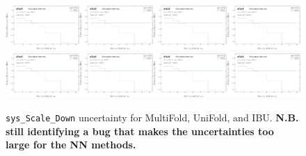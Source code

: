 \begin{figure}[h!]
\includegraphics[width=0.25\textwidth,page=136]{figures/SimResults/Lepton_SystEffect.pdf}\includegraphics[width=0.25\textwidth,page=144]{figures/SimResults/Lepton_SystEffect.pdf}\includegraphics[width=0.25\textwidth,page=152]{figures/SimResults/Lepton_SystEffect.pdf}\includegraphics[width=0.25\textwidth,page=160]{figures/SimResults/Lepton_SystEffect.pdf}\\
\includegraphics[width=0.25\textwidth,page=168]{figures/SimResults/Lepton_SystEffect.pdf}\includegraphics[width=0.25\textwidth,page=176]{figures/SimResults/Lepton_SystEffect.pdf}\includegraphics[width=0.25\textwidth,page=184]{figures/SimResults/Lepton_SystEffect.pdf}\includegraphics[width=0.25\textwidth,page=192]{figures/SimResults/Lepton_SystEffect.pdf}
\caption{\texttt{sys\_Scale\_Down} uncertainty for MultiFold, UniFold, and IBU.  \textbf{N.B. still identifying a bug that makes the uncertainties too large for the NN methods.}}
\label{fig:simresultsmulti_Leptonuncertsl8}
\end{figure}